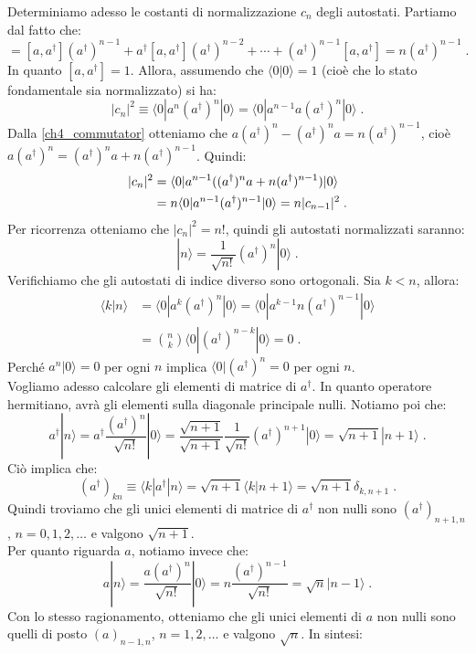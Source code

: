 \documentclass[12pt,a4paper]{report}
\theoremstyle{definition}
\numberwithin{equation}{section}
\newcommand{\bra}{\langle}
\newcommand{\ket}{\rangle}
\newcommand{\adj}[1]{#1^{\dagger}}
\begin{document}
Determiniamo adesso le costanti di normalizzazione $c_n$ degli autostati. Partiamo dal fatto che:
\begin{equation}
[a,(\adj{a})^n]=[a,\adj{a}](\adj{a})^{n-1}+\adj{a}[a,\adj{a}](\adj{a})^{n-2}+\cdots+(\adj{a})^{n-1}[a,\adj{a}]=n(\adj{a})^{n-1}\;. \label{ch4_commutator}
\end{equation}
In quanto $[a,\adj{a}]=1$. Allora, assumendo che $\bra 0|0\ket=1$ (cioè che lo stato fondamentale sia normalizzato) si ha:
$$
|c_n|^2\equiv \bra 0|a^n(\adj{a})^n|0\ket=\bra 0|a^{n-1}a(\adj{a})^n|0\ket\;.
$$
Dalla \eqref{ch4_commutator} otteniamo che $a(\adj{a})^n-(\adj{a})^na=n(\adj{a})^{n-1}$, cioè $a(\adj{a})^n=(\adj{a})^na+n(\adj{a})^{n-1}$. Quindi:
\begin{align}
|c_n|^2&=\bra 0|a^{n-1}((\adj{a})^na+n(\adj{a})^{n-1})|0\ket \notag \\
&= n\bra 0|a^{n-1}(\adj{a})^{n-1}|0\ket=n|c_{n-1}|^2\;.
\end{align}
Per ricorrenza otteniamo che $|c_n|^2=n!$, quindi gli autostati normalizzati saranno:
\begin{equation}
|n\ket=\frac{1}{\sqrt{n!}}(\adj{a})^n|0\ket\;.
\end{equation}
Verifichiamo che gli autostati di indice diverso sono ortogonali. Sia $k<n$, allora:
\begin{align*}
\bra k|n\ket &= \bra 0|a^k(\adj{a})^n|0\ket=\bra 0|a^{k-1}n(\adj{a})^{n-1}|0\ket  \\
&=\binom{n}{k}\bra 0|(\adj{a})^{n-k}|0\ket=0\;.
\end{align*}
Perché $a^n|0\ket=0$ per ogni $n$ implica $\bra 0|(\adj{a})^n=0$ per ogni $n$. \\
Vogliamo adesso calcolare gli elementi di matrice di $\adj{a}$. In quanto operatore hermitiano, avrà gli elementi sulla diagonale principale nulli. Notiamo poi che:
$$
\adj{a}|n\ket=\adj{a}\frac{(\adj{a})^n}{\sqrt{n!}}|0\ket=\frac{\sqrt{n+1}}{\sqrt{n+1}}\frac{1}{\sqrt{n!}}(\adj{a})^{n+1}|0\ket=\sqrt{n+1}|n+1\ket\;.
$$
Ciò implica che:
$$
(\adj{a})_{kn}\equiv\bra k|\adj{a}|n\ket=\sqrt{n+1}\bra k|n+1\ket=\sqrt{n+1}\delta_{k,n+1}\;.
$$
Quindi troviamo che gli unici elementi di matrice di $\adj{a}$ non nulli sono $(\adj{a})_{n+1,n}$, $n=0,1,2,\ldots$ e valgono $\sqrt{n+1}$. \\
Per quanto riguarda $a$, notiamo invece che:
$$
a|n\ket=\frac{a(\adj{a})^n}{\sqrt{n!}}|0\ket=n\frac{(\adj{a})^{n-1}}{\sqrt{n!}}=\sqrt{n}|n-1\ket\;.
$$
Con lo stesso ragionamento, otteniamo che gli unici elementi di $a$ non nulli sono quelli di posto $(a)_{n-1,n}$, $n=1,2,\ldots$ e valgono $\sqrt{n}$. In sintesi:
\end{document}
